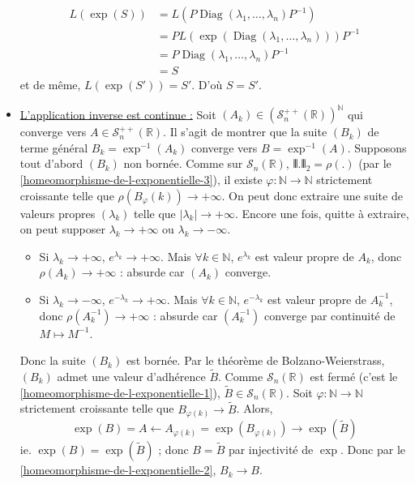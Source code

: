 \begin{demonstration}
\begin{itemize}
			\begin{align*}
				L(\exp(S)) &= L(P \operatorname{Diag}(\lambda_1, \dots, \lambda_n) P^{-1}) \\
				&= P L(\exp(\operatorname{Diag}(\lambda_1, \dots, \lambda_n))) P^{-1} \\
				&= P \operatorname{Diag}(\lambda_1, \dots, \lambda_n) P^{-1} \\
				&= S
			\end{align*}
			et de même, $L(\exp(S')) = S'$. D'où $S = S'$.
			\item \underline{L'application inverse est continue :} Soit $(A_k) \in (\mathcal{S}^{++}_n(\mathbb{R}))^\mathbb{N}$ qui converge vers $A \in \mathcal{S}^{++}_n(\mathbb{R})$. Il s'agit de montrer que la suite $(B_k)$ de terme général $B_k = \exp^{-1}(A_k)$ converge vers $B = \exp^{-1}(A)$. Supposons tout d'abord $(B_k)$ non bornée. Comme sur $\mathcal{S}_n(\mathbb{R})$, $\VERT . \VERT_2 = \rho(.)$ (par le \cref{homeomorphisme-de-l-exponentielle-3}), il existe $\varphi : \mathbb{N} \rightarrow \mathbb{N}$ strictement croissante telle que $\rho(B_\varphi(k)) \longrightarrow +\infty$. On peut donc extraire une suite de valeurs propres $(\lambda_k)$ telle que $|\lambda_k| \longrightarrow +\infty$. Encore une fois, quitte à extraire, on peut supposer $\lambda_k \longrightarrow +\infty$ ou $\lambda_k \longrightarrow -\infty$.
			\begin{itemize}
				\item Si $\lambda_k \longrightarrow +\infty$, $e^{\lambda_k} \longrightarrow +\infty$. Mais $\forall k \in \mathbb{N}$, $e^{\lambda_k}$ est valeur propre de $A_k$, donc $\rho(A_k) \longrightarrow +\infty$ : absurde car $(A_k)$ converge.
				\item Si $\lambda_k \longrightarrow -\infty$, $e^{-\lambda_k} \longrightarrow +\infty$. Mais $\forall k \in \mathbb{N}$, $e^{-\lambda_k}$ est valeur propre de $A_k^{-1}$, donc $\rho(A_k^{-1}) \longrightarrow +\infty$ : absurde car $(A_k^{-1})$ converge par continuité de $M \mapsto M^{-1}$.
			\end{itemize}
			Donc la suite $(B_k)$ est bornée. Par le théorème de Bolzano-Weierstrass, $(B_k)$ admet une valeur d'adhérence $\widetilde{B}$. Comme $\mathcal{S}_n(\mathbb{R})$ est fermé (c'est le \cref{homeomorphisme-de-l-exponentielle-1}), $\widetilde{B} \in \mathcal{S}_n(\mathbb{R})$.
			\newpar
			Soit $\varphi : \mathbb{N} \rightarrow \mathbb{N}$ strictement croissante telle que $B_{\varphi(k)} \longrightarrow \widetilde{B}$. Alors,
			\[ \exp(B) = A \longleftarrow A_{\varphi(k)} = \exp(B_{\varphi(k)}) \longrightarrow \exp(\widetilde{B}) \]
			ie. $\exp(B) = \exp(\widetilde{B})$ ; donc $B = \widetilde{B}$ par injectivité de $\exp$. Donc par le \cref{homeomorphisme-de-l-exponentielle-2}, $B_k \longrightarrow B$.
		\end{itemize}
	\end{demonstration}

